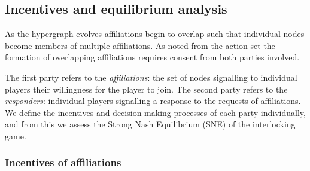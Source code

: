 \documentclass[11pt,fleqn]{article}
\begin{document}
%

\subsection{Incentives and equilibrium analysis}

As the hypergraph evolves affiliations begin to overlap such that individual nodes become members of multiple affiliations. As noted from the action set the formation of overlapping affiliations requires consent from both parties involved.

The first party refers to the \emph{affiliations}: the set of nodes signalling to individual players their willingness for the player to join. The second party refers to the \emph{responders}: individual players signalling a response to the requests of affiliations. We define the incentives and decision-making processes of each party individually, and from this we assess the Strong Nash Equilibrium (SNE) of the interlocking game.

\subsubsection*{Incentives of affiliations}
\end{document}
